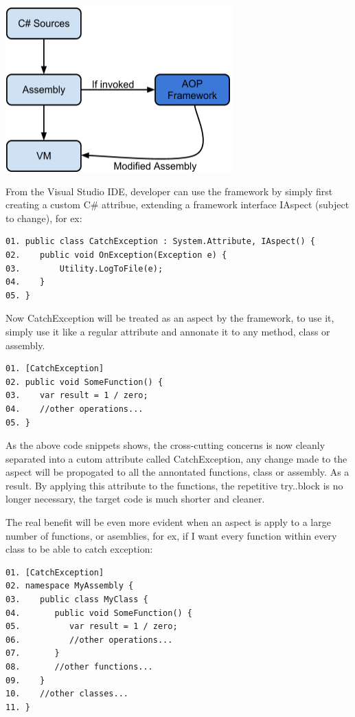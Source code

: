 \includegraphics[width=331px,keepaspectratio=true]{model_overview.png}

From the Visual Studio IDE, developer can use the framework by simply first creating a custom C\# attribue, extending a framework interface IAspect (subject to change), for ex:

\begin{verbatim}
01. public class CatchException : System.Attribute, IAspect() {
02.    public void OnException(Exception e) {
03.        Utility.LogToFile(e);
04.    } 
05. }
\end{verbatim}

Now CatchException will be treated as an aspect by the framework, to use it, simply use it like a regular attribute and annonate it to any method, class or assembly.

\begin{verbatim}
01. [CatchException]
02. public void SomeFunction() {
03.    var result = 1 / zero;
04.    //other operations...
05. }
\end{verbatim}

As the above code snippets shows, the cross-cutting concerns is now cleanly separated into a cutom attribute called CatchException, any change made to the aspect will be propogated to all the annontated functions, class or assembly. As a result. By applying this attribute to the functions, the repetitive try..block is no longer necessary, the target code is much shorter and cleaner. 

The real benefit will be even more evident when an aspect is apply to a large number of functions, or asemblies, for ex, if I want every function within every class to be able to catch exception:

\begin{verbatim}
01. [CatchException]
02. namespace MyAssembly {
03.    public class MyClass {
04.       public void SomeFunction() {
05.          var result = 1 / zero;
06.          //other operations...
07.       }
08.       //other functions...
09.    }
10.    //other classes...
11. }
\end{verbatim}

